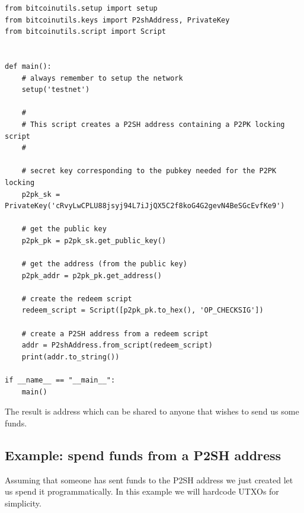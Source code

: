 \vspace{1em}
\begin{lstlisting}[style=Python]
from bitcoinutils.setup import setup
from bitcoinutils.keys import P2shAddress, PrivateKey
from bitcoinutils.script import Script


def main():
    # always remember to setup the network
    setup('testnet')

    #
    # This script creates a P2SH address containing a P2PK locking script
    #

    # secret key corresponding to the pubkey needed for the P2PK locking
    p2pk_sk = PrivateKey('cRvyLwCPLU88jsyj94L7iJjQX5C2f8koG4G2gevN4BeSGcEvfKe9')

    # get the public key
    p2pk_pk = p2pk_sk.get_public_key()

    # get the address (from the public key)
    p2pk_addr = p2pk_pk.get_address()

    # create the redeem script
    redeem_script = Script([p2pk_pk.to_hex(), 'OP_CHECKSIG'])

    # create a P2SH address from a redeem script
    addr = P2shAddress.from_script(redeem_script)
    print(addr.to_string())

if __name__ == "__main__":
    main()
\end{lstlisting}
\vspace{1em}

The result is address  which can be shared to anyone that wishes to send us some funds.


\subsection*{Example: spend funds from a P2SH address}
Assuming that someone has sent funds to the P2SH address we just created let us spend it programmatically. In this example we will hardcode UTXOs for simplicity.


